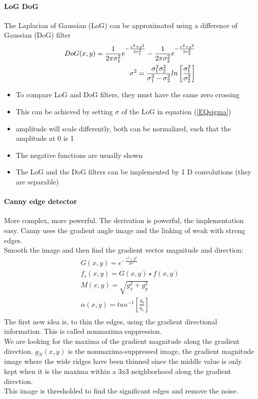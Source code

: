 \paragraph{LoG DoG}
The Laplacian of Gaussian (LoG) can be approximated using a difference of Gaussian (DoG) filter
\begin{align}
DoG(x,y)=\frac{1}{2\pi\sigma_1^2}e^{-\frac{x^2+y^2}{2\sigma_1^2}}-\frac{1}{2\pi\sigma_2^2}e^{-\frac{x^2+y^2}{2\sigma_2^2}}\notag\\
\sigma^2=\frac{\sigma_1^2\sigma_2^2}{\sigma_1^2-\sigma_2^2}ln\left[\frac{\sigma_1^2}{\sigma_2^2}\right]\label{EQsigma}
\end{align}
\begin{itemize}
\item To compare LoG and DoG filters, they must have the same zero crossing
\item This can be achieved by setting $\sigma$ of the LoG in equation (\ref{EQsigma})
\item amplitude will scale differently, both can be normalized, such that the amplitude at 0 is 1
\item The negative functions are usually shown
\item The LoG and the DoG filters can be implemented by 1 D convolutions (they are separable)
\end{itemize}

\paragraph{Canny edge detector}
More complex, more powerful. The derivation is powerful, the implementation easy. Canny uses the gradient angle image and the linking of weak with strong edges.\\
Smooth the image and then find the gradient vector magnitude and direction:
\begin{align*}
G(x,y) = e^{-\frac{x^2+y^2}{2\sigma^2}}\\
f_s(x,y)=G(x,y)\star f(x,y)\\
M(x,y) = \sqrt{g_x^2+g_y^2}\\
\alpha(x,y) = tan^{-1}\left[\frac{g_y}{g_x}\right]\\
\end{align*}
The first new idea is, to thin the edges, using the gradient directional information. This is called nonmaxima suppression.\\
We are looking for the maxima of the gradient magnitude along the gradient direction. $g_N(x,y)$ is the nonmaxima-suppressed image, the gradient magnitude image where the wide ridges have been thinned since the middle value is only kept when it is the maxima within a 3x3 neighborhood along the gradient direction.\\
This image is thresholded to find the significant edges and remove the noise.

